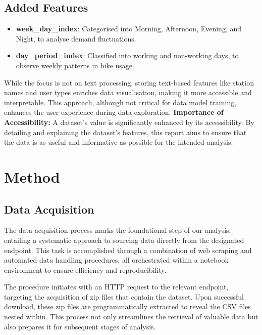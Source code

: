 \documentclass[12pt, a4paper]{article}
\begin{document}
    \subsection{Added Features}\label{subsec:added-features}
    \begin{itemize}
        \item \textbf{week\_day\_index}: Categorised into Morning, Afternoon, Evening, and Night, to analyse demand fluctuations.
        \item \textbf{day\_period\_index}: Classified into working and non-working days, to observe weekly patterns in bike usage.
    \end{itemize}

    While the focus is not on text processing, storing text-based features like station names and user types enriches data visualisation, making it more accessible and interpretable.
    This approach, although not critical for data model training, enhances the user experience during data exploration.\newline
    \newline\textbf{Importance of Accessibility:}\newline
    A dataset's value is significantly enhanced by its accessibility.
    By detailing and explaining the dataset's features, this report aims to ensure that the data is as useful and informative as possible for the intended analysis.

    \section*{Method}
    \label{sec:method}

    \subsection{Data Acquisition}\label{subsec:data-acquisition}

    The data acquisition process marks the foundational step of our analysis, entailing a systematic approach to sourcing data directly from the designated endpoint.
    This task is accomplished through a combination of web scraping and automated data handling procedures, all orchestrated within a notebook environment to ensure efficiency and reproducibility.

    The procedure initiates with an HTTP request to the relevant endpoint, targeting the acquisition of zip files that contain the dataset.
    Upon successful download, these zip files are programmatically extracted to reveal the CSV files nested within.
    This process not only streamlines the retrieval of valuable data but also prepares it for subsequent stages of analysis.
\end{document}
